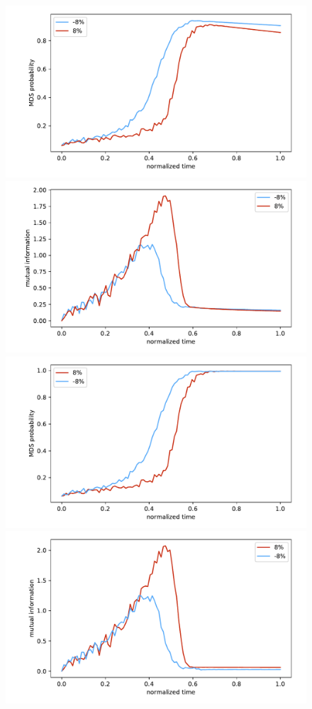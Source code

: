 \documentclass[prd,twocolumn,tightenlines,preprintnumbers,showpacs,superscriptaddress,notitlepage,nofootinbib,eqsecnum,floatfix,longbibliography]{revtex4}
\begin{document}
\begin{figure}
    \centering
    \includegraphics[width=\columnwidth]{./figures/full_prob_deco.pdf}
    \includegraphics[width=\columnwidth]{./figures/mutual_info_deco.pdf}
    \includegraphics[width=\columnwidth]{./figures/full_prob_nodeco.pdf}
    \includegraphics[width=\columnwidth]{./figures/mutual_info_nodeco.pdf}

\end{figure}
\end{document}
